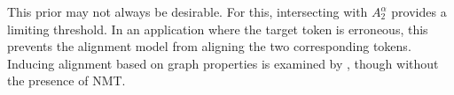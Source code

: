 This prior may not always be desirable. For this, intersecting with $A_2^\alpha$ provides a limiting threshold. In an application where the target token is erroneous, this prevents the alignment model from aligning the two corresponding tokens.
Inducing alignment based on graph properties is examined by \citet{symmetric}, though without the presence of NMT.